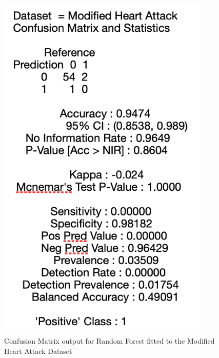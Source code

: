 \begin{figure}[!htbp]
    \centering
    \begin{minipage}{0.45\textwidth}
        \centering
        \includegraphics[width=0.9\textwidth]{ThesisTemplate/appendix/images/Chapter5Appendix/ConfusionMatrix/modHeartAttack.png} 
        \caption{Confusion Matrix output for Random Forest fitted to the Modified Heart Attack Dataset}
        \label{fig:matrixmodHA}
    \end{minipage}\hfill
    \begin{minipage}{0.45\textwidth}
        \centering

\end{minipage}
\end{figure}
